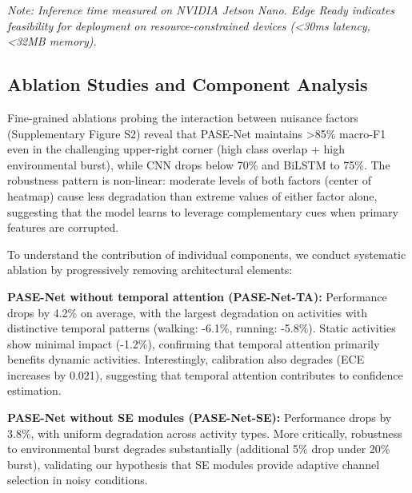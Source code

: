 \documentclass[lettersize,journal]{IEEEtran}
\begin{document}
\textit{Note: Inference time measured on NVIDIA Jetson Nano. Edge Ready indicates feasibility for deployment on resource-constrained devices (<30ms latency, <32MB memory).}
\fi

\subsection{Ablation Studies and Component Analysis}

Fine-grained ablations probing the interaction between nuisance factors (Supplementary Figure S2) reveal that PASE-Net maintains >85\% macro-F1 even in the challenging upper-right corner (high class overlap + high environmental burst), while CNN drops below 70\% and BiLSTM to 75\%. The robustness pattern is non-linear: moderate levels of both factors (center of heatmap) cause less degradation than extreme values of either factor alone, suggesting that the model learns to leverage complementary cues when primary features are corrupted.

To understand the contribution of individual components, we conduct systematic ablation by progressively removing architectural elements:

\textbf{PASE-Net without temporal attention (PASE-Net-TA):} Performance drops by 4.2\% on average, with the largest degradation on activities with distinctive temporal patterns (walking: -6.1\%, running: -5.8\%). Static activities show minimal impact (-1.2\%), confirming that temporal attention primarily benefits dynamic activities. Interestingly, calibration also degrades (ECE increases by 0.021), suggesting that temporal attention contributes to confidence estimation.

\textbf{PASE-Net without SE modules (PASE-Net-SE):} Performance drops by 3.8\%, with uniform degradation across activity types. More critically, robustness to environmental burst degrades substantially (additional 5\% drop under 20\% burst), validating our hypothesis that SE modules provide adaptive channel selection in noisy conditions.
\end{document}
